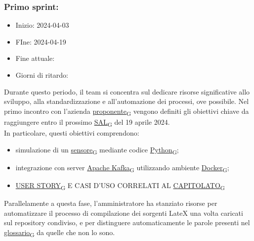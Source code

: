     \subsubsection{Primo sprint:}
        \begin{itemize}
            \item Inizio: 2024-04-03
            \item FIne: 2024-04-19
            \item Fine attuale: 
            \item Giorni di ritardo: 
        \end{itemize}
        Durante questo periodo, il team si concentra sul dedicare risorse significative allo sviluppo, alla standardizzazione e all'automazione dei processi, ove possibile. Nel primo incontro con l'azienda \href{https://7last.github.io/docs/rtb/documentazione-interna/glossario\#proponente}{proponente\textsubscript{G}} vengono definiti gli obiettivi chiave da raggiungere entro il prossimo \href{https://7last.github.io/docs/rtb/documentazione-interna/glossario\#sal}{SAL\textsubscript{G}} del 19 aprile 2024. \\In particolare, questi obiettivi comprendono:
        \begin{itemize}
            \item simulazione di un \href{https://7last.github.io/docs/rtb/documentazione-interna/glossario\#sensore}{sensore\textsubscript{G}} mediante codice \href{https://7last.github.io/docs/rtb/documentazione-interna/glossario\#python}{Python\textsubscript{G}};
            \item integrazione con server \href{https://7last.github.io/docs/rtb/documentazione-interna/glossario\#apache-kafka}{Apache Kafka\textsubscript{G}} utilizzando ambiente \href{https://7last.github.io/docs/rtb/documentazione-interna/glossario\#docker}{Docker\textsubscript{G}};
            \item \href{https://7last.github.io/docs/rtb/documentazione-interna/glossario\#user-story}{USER STORY\textsubscript{G}} E CASI D'USO CORRELATI AL \href{https://7last.github.io/docs/rtb/documentazione-interna/glossario\#capitolato}{CAPITOLATO\textsubscript{G}}
        \end{itemize}

        Parallelamente a questa fase, l'amministratore ha stanziato risorse per automatizzare il processo di compilazione dei sorgenti LateX una volta caricati sul repository condiviso, e per distinguere automaticamente le parole presenti nel \href{https://7last.github.io/docs/rtb/documentazione-interna/glossario\#glossario}{glossario\textsubscript{G}} da quelle che non lo sono.

